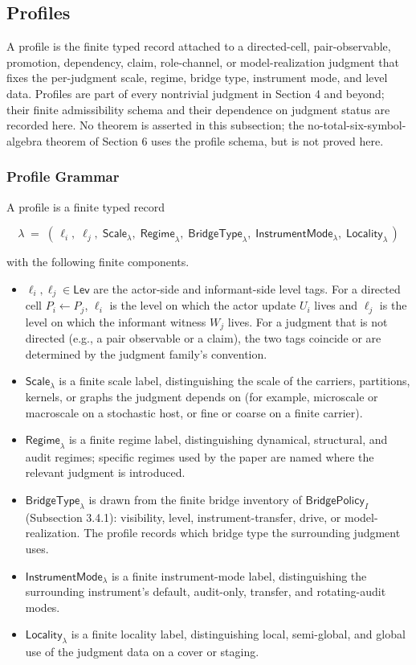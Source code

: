 \documentclass[11pt]{article}
\providecommand{\tightlist}{}
\theoremstyle{definition}
\begin{document}
\subsection{Profiles}

A profile is the finite typed record attached to a directed-cell, pair-observable, promotion, dependency, claim, role-channel, or model-realization judgment that fixes the per-judgment scale, regime, bridge type, instrument mode, and level data. Profiles are part of every nontrivial judgment in Section 4 and beyond; their finite admissibility schema and their dependence on judgment status are recorded here. No theorem is asserted in this subsection; the no-total-six-symbol-algebra theorem of Section 6 uses the profile schema, but is not proved here.

\subsubsection{Profile Grammar}

A profile is a finite typed record

\[
\lambda\;=\;(\,\ell_i,\;\ell_j,\;\mathsf{Scale}_\lambda,\;\mathsf{Regime}_\lambda,\;\mathsf{BridgeType}_\lambda,\;\mathsf{InstrumentMode}_\lambda,\;\mathsf{Locality}_\lambda\,)
\]

with the following finite components.

\begin{itemize}
\tightlist
\item
  \(\ell_i,\ell_j\in\mathsf{Lev}\) are the actor-side and informant-side level tags. For a directed cell \(P_i\leftarrow P_j\), \(\ell_i\) is the level on which the actor update \(U_i\) lives and \(\ell_j\) is the level on which the informant witness \(W_j\) lives. For a judgment that is not directed (e.g., a pair observable or a claim), the two tags coincide or are determined by the judgment family's convention.
\item
  \(\mathsf{Scale}_\lambda\) is a finite scale label, distinguishing the scale of the carriers, partitions, kernels, or graphs the judgment depends on (for example, microscale or macroscale on a stochastic host, or fine or coarse on a finite carrier).
\item
  \(\mathsf{Regime}_\lambda\) is a finite regime label, distinguishing dynamical, structural, and audit regimes; specific regimes used by the paper are named where the relevant judgment is introduced.
\item
  \(\mathsf{BridgeType}_\lambda\) is drawn from the finite bridge inventory of \(\mathsf{BridgePolicy}_I\) (Subsection 3.4.1): visibility, level, instrument-transfer, drive, or model-realization. The profile records which bridge type the surrounding judgment uses.
\item
  \(\mathsf{InstrumentMode}_\lambda\) is a finite instrument-mode label, distinguishing the surrounding instrument's default, audit-only, transfer, and rotating-audit modes.
\item
  \(\mathsf{Locality}_\lambda\) is a finite locality label, distinguishing local, semi-global, and global use of the judgment data on a cover or staging.
\end{itemize}
\end{document}
